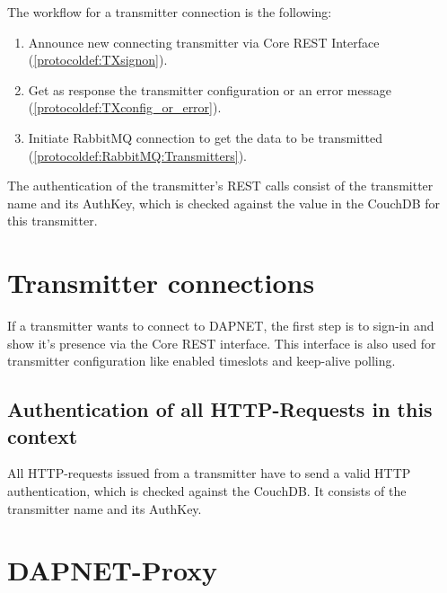 The workflow for a transmitter connection is the following:
\begin{enumerate}
\item Announce new connecting transmitter via Core REST Interface (\ref{protocoldef:TXsignon}).
\item Get as response the transmitter configuration or an error message (\ref{protocoldef:TXconfig_or_error}).
\item Initiate RabbitMQ connection to get the data to be transmitted (\ref{protocoldef:RabbitMQ:Transmitters}).
\end{enumerate}

The authentication of the transmitter's REST calls consist of the transmitter
name and its AuthKey, which is checked against the value in the CouchDB for this
transmitter.

\section{Transmitter connections}
If a transmitter wants to connect to DAPNET, the first step is to sign-in and
show it's presence via the Core REST interface. This interface is also used for
transmitter configuration like enabled timeslots and keep-alive polling.

\subsection{Authentication of all HTTP-Requests in this context}
All HTTP-requests issued from a transmitter have to send a valid HTTP
authentication, which is checked against the CouchDB. It consists of the
transmitter name and its AuthKey.


\section{DAPNET-Proxy}